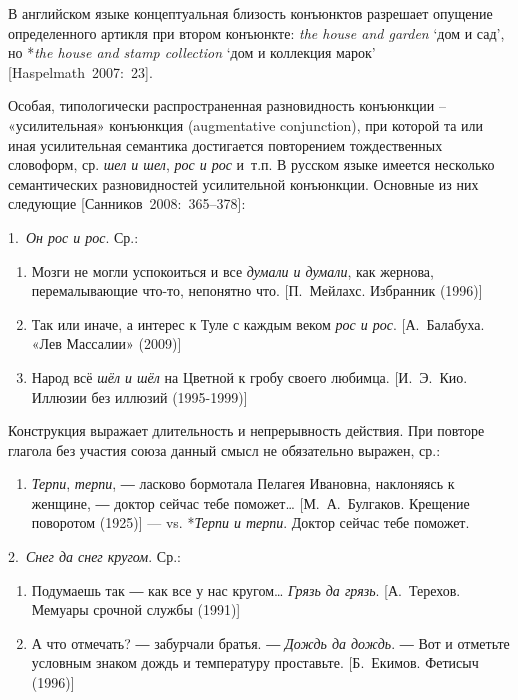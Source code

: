 В английском языке концептуальная близость конъюнктов разрешает опущение
определенного артикля при втором конъюнкте: \textit{the house and garden}
`дом и сад', но *\textit{the house and stamp collection} `дом и коллекция
марок' {[}Haspelmath~2007:~23{]}.

Особая, типологически распространенная разновидность конъюнкции --
«усилительная» конъюнкция (augmentative conjunction), при которой та или
иная усилительная семантика достигается повторением тождественных
словоформ, ср. \textit{шел и шел}, \textit{рос и рос} и~т.п. В русском языке
имеется несколько семантических разновидностей усилительной конъюнкции.
Основные из них следующие {[}Санников~2008:~365--378{]}:

1.~\textit{Он рос и рос}. Ср.:

\begin{enumerate}
\def\labelenumi{(\arabic{enumi})}
\setcounter{enumi}{160}
\item
  Мозги не могли успокоиться и все \textit{думали и думали}, как жернова,
  перемалывающие что-то, непонятно что. {[}П.~Мейлахс. Избранник
  (1996){]}
\item
  Так или иначе, а интерес к Туле с каждым веком \textit{рос и рос}.
  {[}А.~Балабуха. «Лев Массалии» (2009){]}
\item
  Народ всё \textit{шёл и шёл} на Цветной к гробу своего любимца.
  {[}И.~Э.~Кио. Иллюзии без иллюзий (1995-1999){]}
\end{enumerate}

Конструкция выражает длительность и непрерывность действия. При повторе
глагола без участия союза данный смысл не обязательно выражен, ср.:

\begin{enumerate}
\def\labelenumi{(\arabic{enumi})}
\setcounter{enumi}{163}
\item
  \textit{Терпи}, \textit{терпи}, ― ласково бормотала Пелагея Ивановна,
  наклоняясь к женщине, ― доктор сейчас тебе поможет\ldots{}
  {[}М.~А.~Булгаков. Крещение поворотом (1925){]} --- vs. *\textit{Терпи и
  терпи}. Доктор сейчас тебе поможет.
\end{enumerate}

2.~\textit{Снег да снег кругом}. Ср.:

\begin{enumerate}
\def\labelenumi{(\arabic{enumi})}
\setcounter{enumi}{164}
\item
  Подумаешь так ― как все у нас кругом\ldots{} \textit{Грязь да грязь}.
  {[}А.~Терехов. Мемуары срочной службы (1991){]}
\item
  А что отмечать? ― забурчали братья. ― \textit{Дождь да дождь}. ― Вот и
  отметьте условным знаком дождь и температуру проставьте. {[}Б.~Екимов.
  Фетисыч (1996){]}
\end{enumerate}

